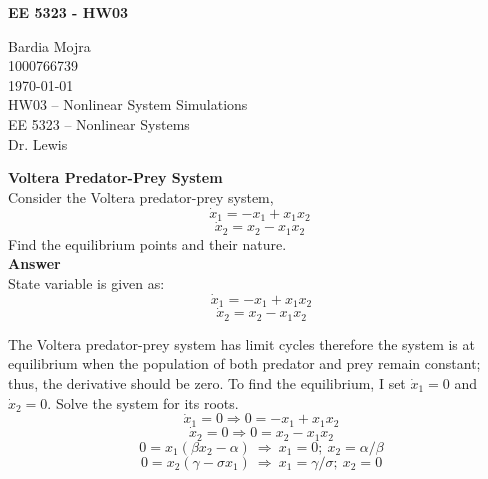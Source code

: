 \documentclass{homeworg}
\begin{document}
\begin{center}
\textbf{EE 5323 - HW03}\\
\end{center}

\noindent
Bardia Mojra\\
1000766739\\
\today\\
HW03 -- Nonlinear System Simulations\\
EE 5323 -- Nonlinear Systems\\
Dr. Lewis

\exercise
\noindent
\textbf{Voltera Predator-Prey System} \\
Consider the Voltera predator-prey system,\\
\begin{equation}
\dot{x}_1 = - x_1 + x_1 x_2
\end{equation}
\begin{equation}
\dot{x}_2 = x_2 -  x_1 x_2
\end{equation}
Find the equilibrium points and their nature.\\

\noindent
\textbf{Answer} \\
State variable is given as:
\begin{equation}
~\dot{x}_1 = - x_1 + x_1 x_2
\end{equation}
\begin{equation}
~\dot{x}_2 = x_2 -  x_1 x_2
\end{equation}

The Voltera predator-prey system has limit cycles therefore the system is
at equilibrium when the population of both predator and prey remain
constant; thus, the derivative should be zero.
To find the equilibrium, I set $\dot{x}_{1}=0$ and $\dot{x}_{2}=0$.
Solve the system for its roots.\\

\begin{equation}
~\dot{x}_1 = 0 \Rightarrow 0 =  - x_1 + x_1 x_2
\end{equation}
\begin{equation}
~\dot{x}_2 = 0 \Rightarrow 0 = x_2 -  x_1 x_2
\end{equation}
\begin{equation}
~0 = x_1 (\beta x_2 - \alpha)~\Rightarrow~x_1 = 0 ; ~x_2 = \alpha/\beta
\end{equation}
\begin{equation}
  ~0 = x_2 (\gamma - \sigma x_1)~\Rightarrow~x_1 = \gamma/\sigma ; ~x_2 = 0
\end{equation}
\end{document}
